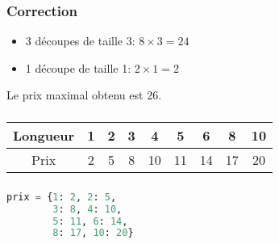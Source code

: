 \documentclass[svgnames,11pt]{beamer}
\begin{document}
\begin{frame}
    \frametitle{Correction}

    \begin{itemize}
        \item 3 découpes de taille 3: $8×3=24$
        \item 1 découpe de taille 1: $2×1=2$
    \end{itemize}
\begin{center}
    Le prix maximal obtenu est 26.
\end{center}
\end{frame}
\begin{frame}
    \frametitle{}
    \begin{center}
        \begin{tabular}{|*{9}{c|}}
            \hline
            Longueur & 1 & 2 & 3 & 4 & 5 & 6 & 8 & 10 \\
            \hline
            Prix & 2 & 5 & 8 & 10 & 11 & 14 & 17 & 20 \\
            \hline
        \end{tabular}
    \end{center}
    \begin{center}
    \end{center}

\end{frame}
\begin{frame}[fragile]
    \frametitle{}

\begin{center}
\begin{lstlisting}[language=Python , basicstyle=\ttfamily\small, xleftmargin=0.2em, xrightmargin=0em]
prix = {1: 2, 2: 5, 
        3: 8, 4: 10, 
        5: 11, 6: 14, 
        8: 17, 10: 20}
\end{lstlisting}
\label{CODE}
\end{center}

\end{frame}
\end{document}
